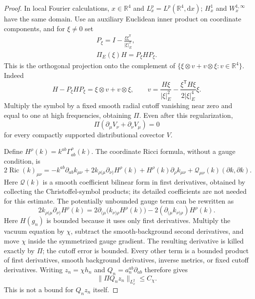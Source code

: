 \documentclass[11pt,a4paper]{article}
\numberwithin{equation}{section}
\newcommand{\Ric}{\operatorname{Ric}}
\newcommand{\dd}{\mathrm d}
\newcommand{\R}{\mathbb R}
\newcommand{\f}[2]{\frac{#1}{#2}}
\theoremstyle{definition}
\begin{document}
\begin{proof}
In local Fourier calculations, $x\in\R^4$ and
$L^p_x=L^p(\R^4,\dd x)$; $H^1_x$ and $W^{1,\infty}_x$
have the same domain. Use an auxiliary Euclidean inner product on coordinate components, and
for $\xi\ne0$ set
\begin{equation*}
\begin{gathered}
P_\xi=I-\f{\xi\xi^{\mathsf T}}{|\xi|_E^2},\\
\Pi_E(\xi)H=P_\xi H P_\xi.
\end{gathered}
\end{equation*}
This is the orthogonal projection onto the complement of
$\{\xi\otimes v+v\otimes\xi:v\in\R^4\}$. Indeed
\begin{equation*}
H-P_\xi H P_\xi=\xi\otimes v+v\otimes\xi,\qquad
v=\f{H\xi}{|\xi|_E^2}
 -\f{\xi^{\mathsf T}H\xi}{2|\xi|_E^4}\xi.
\end{equation*}
Multiply the symbol by a fixed smooth radial cutoff vanishing near zero
and equal to one at high frequencies, obtaining $\Pi$. Even after this
regularization,
\begin{equation*}
\Pi(\partial_\mu V_\nu+\partial_\nu V_\mu)=0
\end{equation*}
for every compactly supported distributional covector $V$.

Define $H^\rho(k)=k^{ab}\Gamma^\rho_{ab}(k)$. The coordinate Ricci
formula, without a gauge condition, is
\begin{equation*}
2\Ric(k)_{\mu\nu}
=-k^{ab}\partial_{ab}k_{\mu\nu}
 +2k_{\rho(\mu}\partial_{\nu)}H^\rho(k)
 +H^\rho(k)\partial_\rho k_{\mu\nu}
 +\mathcal Q_{\mu\nu}(k)(\partial k,\partial k).
\end{equation*}
Here $\mathcal Q(k)$ is a smooth coefficient bilinear form in first
derivatives, obtained by collecting the Christoffel-symbol products;
its detailed coefficients are not needed for this estimate.
The potentially unbounded gauge term can be rewritten as
\begin{equation*}
2k_{\rho(\mu}\partial_{\nu)}H^\rho(k)
=2\partial_{(\mu}\big(k_{\nu)\rho}H^\rho(k)\big)
 -2(\partial_{(\mu}k_{\nu)\rho})H^\rho(k).
\end{equation*}
Here $H(g_n)$ is bounded because it uses only first derivatives.
Multiply the vacuum equation by $\chi$, subtract the smooth-background
second derivatives, and move $\chi$ inside the symmetrized gauge gradient.
The resulting derivative is killed exactly by $\Pi$; the cutoff error is
bounded. Every other term is a bounded product of first derivatives, smooth
background derivatives, inverse metrics, or fixed cutoff derivatives.
Writing $z_n=\chi h_n$ and $Q_n=a_n^{ab}\partial_{ab}$ therefore gives
\begin{equation*}
\|\Pi Q_nz_n\|_{L^2_x}\leq C_\chi.
\end{equation*}
This is not a bound for $Q_nz_n$ itself.


\end{proof}
\end{document}
